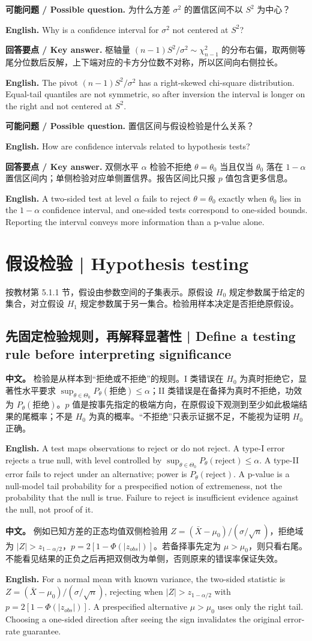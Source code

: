 \documentclass[UTF8,11pt,a4paper]{ctexart}
\newcommand{\EN}[1]{\par\noindent\textbf{English.} #1\par}
\newcommand{\ASK}[4]{\par\noindent\textbf{可能问题 / Possible question.} #1\par\EN{#2}\noindent\textbf{回答要点 / Key answer.} #3\par\EN{#4}\medskip}
\newcommand{\APS}[2]{\par\noindent\textbf{中文。} #1\par\noindent\textbf{English.} #2\par\smallskip}
\begin{document}
\ASK{为什么方差 $\sigma^2$ 的置信区间不以 $S^2$ 为中心？}{Why is a confidence interval for $\sigma^2$ not centered at $S^2$?}{枢轴量 $(n-1)S^2/\sigma^2\sim\chi^2_{n-1}$ 的分布右偏，取两侧等尾分位数后反解，上下端对应的卡方分位数不对称，所以区间向右侧拉长。}{The pivot $(n-1)S^2/\sigma^2$ has a right-skewed chi-square distribution. Equal-tail quantiles are not symmetric, so after inversion the interval is longer on the right and not centered at $S^2$.}

\ASK{置信区间与假设检验是什么关系？}{How are confidence intervals related to hypothesis tests?}{双侧水平 $\alpha$ 检验不拒绝 $\theta=\theta_0$ 当且仅当 $\theta_0$ 落在 $1-\alpha$ 置信区间内；单侧检验对应单侧置信界。报告区间比只报 $p$ 值包含更多信息。}{A two-sided test at level $\alpha$ fails to reject $\theta=\theta_0$ exactly when $\theta_0$ lies in the $1-\alpha$ confidence interval, and one-sided tests correspond to one-sided bounds. Reporting the interval conveys more information than a p-value alone.}

\section{假设检验 | Hypothesis testing}
\noindent 按教材第 5.1.1 节，假设由参数空间的子集表示。原假设 $H_0$ 规定参数属于给定的集合，对立假设 $H_1$ 规定参数属于另一集合。检验用样本决定是否拒绝原假设。
\subsection*{先固定检验规则，再解释显著性 | Define a testing rule before interpreting significance}
\APS{检验是从样本到“拒绝或不拒绝”的规则。I 类错误在 $H_0$ 为真时拒绝它，显著性水平要求 $\sup_{\theta\in\Theta_0}P_\theta(\text{拒绝})\le\alpha$；II 类错误是在备择为真时不拒绝，功效为 $P_\theta(\text{拒绝})$。$p$ 值是按事先指定的极端方向，在原假设下观测到至少如此极端结果的尾概率；不是 $H_0$ 为真的概率。“不拒绝”只表示证据不足，不能视为证明 $H_0$ 正确。}{A test maps observations to reject or do not reject. A type-I error rejects a true null, with level controlled by $\sup_{\theta\in\Theta_0}P_\theta(\text{reject})\le\alpha$. A type-II error fails to reject under an alternative; power is $P_\theta(\text{reject})$. A p-value is a null-model tail probability for a prespecified notion of extremeness, not the probability that the null is true. Failure to reject is insufficient evidence against the null, not proof of it.}
\APS{例如已知方差的正态均值双侧检验用 $Z=(\bar X-\mu_0)/(\sigma/\sqrt n)$，拒绝域为 $|Z|>z_{1-\alpha/2}$，$p=2[1-\Phi(|z_{obs}|)]$。若备择事先定为 $\mu>\mu_0$，则只看右尾。不能看见结果的正负之后再把双侧改为单侧，否则原来的错误率保证失效。}{For a normal mean with known variance, the two-sided statistic is $Z=(\bar X-\mu_0)/(\sigma/\sqrt n)$, rejecting when $|Z|>z_{1-\alpha/2}$ with $p=2[1-\Phi(|z_{obs}|)]$. A prespecified alternative $\mu>\mu_0$ uses only the right tail. Choosing a one-sided direction after seeing the sign invalidates the original error-rate guarantee.}
\end{document}
